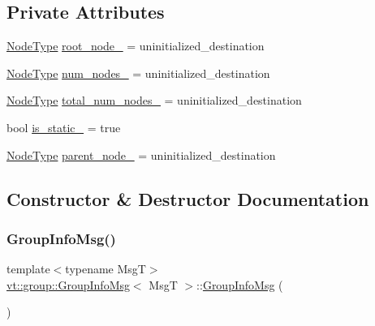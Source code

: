 \subsection*{Private Attributes}
\begin{DoxyCompactItemize}
\item 
\hyperlink{namespacevt_a866da9d0efc19c0a1ce79e9e492f47e2}{Node\+Type} \hyperlink{structvt_1_1group_1_1_group_info_msg_ab16baeca047c903ab90d90c61b63b991}{root\+\_\+node\+\_\+} = uninitialized\+\_\+destination
\item 
\hyperlink{namespacevt_a866da9d0efc19c0a1ce79e9e492f47e2}{Node\+Type} \hyperlink{structvt_1_1group_1_1_group_info_msg_a85b2c79bd1f446a956265df16e8d9a83}{num\+\_\+nodes\+\_\+} = uninitialized\+\_\+destination
\item 
\hyperlink{namespacevt_a866da9d0efc19c0a1ce79e9e492f47e2}{Node\+Type} \hyperlink{structvt_1_1group_1_1_group_info_msg_a1486c52bc955ec3a91fff0628a8212a9}{total\+\_\+num\+\_\+nodes\+\_\+} = uninitialized\+\_\+destination
\item 
bool \hyperlink{structvt_1_1group_1_1_group_info_msg_a14177095a8b6dedb9a8521a9dfb60752}{is\+\_\+static\+\_\+} = true
\item 
\hyperlink{namespacevt_a866da9d0efc19c0a1ce79e9e492f47e2}{Node\+Type} \hyperlink{structvt_1_1group_1_1_group_info_msg_a8893d97bde0f4d59a883b33d86ae5bf1}{parent\+\_\+node\+\_\+} = uninitialized\+\_\+destination
\end{DoxyCompactItemize}


\subsection{Constructor \& Destructor Documentation}
\mbox{\label{structvt_1_1group_1_1_group_info_msg_a2b815dd4e8e961d04e3c118f486acf18}} 
\subsubsection{\texorpdfstring{Group\+Info\+Msg()}{GroupInfoMsg()}\hspace{0.1cm}{\footnotesize\ttfamily [1/2]}}
{\footnotesize\ttfamily template$<$typename MsgT$>$ \\
\hyperlink{structvt_1_1group_1_1_group_info_msg}{vt\+::group\+::\+Group\+Info\+Msg}$<$ MsgT $>$\+::\hyperlink{structvt_1_1group_1_1_group_info_msg}{Group\+Info\+Msg} (\begin{DoxyParamCaption}{ }\end{DoxyParamCaption})\hspace{0.3cm}{\ttfamily [default]}}

